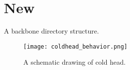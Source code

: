 \section {New}
A backbone directory structure.
\begin{figure}[h]
\begin{center}
\texttt{[image: coldhead\_behavior.png]}
\caption{A schematic drawing of cold head.}
\end{center}
\end{figure}
